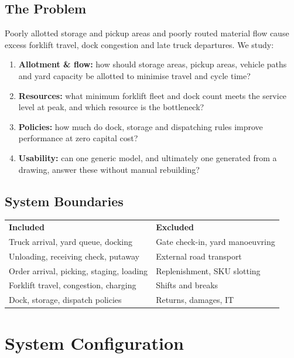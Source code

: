 \documentclass[10pt]{selfArx}
\begin{document}
\subsection*{The Problem}
Poorly allotted storage and pickup areas and poorly routed material flow cause excess forklift travel, dock congestion and late truck departures. We study:
\begin{enumerate}
  \item \textbf{Allotment \& flow:} how should storage areas, pickup areas, vehicle paths and yard capacity be allotted to minimise travel and cycle time?
  \item \textbf{Resources:} what minimum forklift fleet and dock count meets the service level at peak, and which resource is the bottleneck?
  \item \textbf{Policies:} how much do dock, storage and dispatching rules improve performance at zero capital cost?
  \item \textbf{Usability:} can one generic model, and ultimately one generated from a drawing, answer these without manual rebuilding?
\end{enumerate}
\subsection*{System Boundaries}
{\footnotesize
\renewcommand{\arraystretch}{1.05}
\setlength{\tabcolsep}{3pt}
\noindent\begin{tabularx}{\columnwidth}{LL}
 \textbf{Included} & \textbf{Excluded} \\
Truck arrival, yard queue, docking & Gate check-in, yard manoeuvring \\
Unloading, receiving check, putaway & External road transport \\
Order arrival, picking, staging, loading & Replenishment, SKU slotting \\
Forklift travel, congestion, charging & Shifts and breaks \\
Dock, storage, dispatch policies & Returns, damages, IT \\
\end{tabularx}}



\section{System Configuration}
\end{document}
